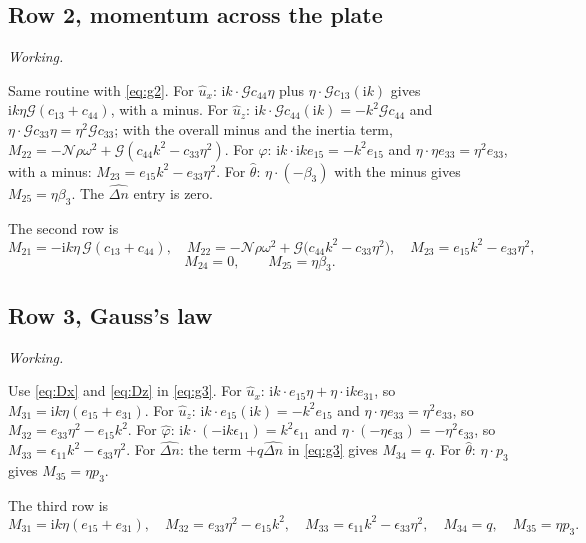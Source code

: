 \documentclass[11pt,a4paper]{article}
\newif\ifshowworked \showworkedtrue
\newenvironment{worked}{\ifshowworked\par\smallskip\noindent\textit{Working.}\par\else\setbox0\vbox\bgroup\fi}{\ifshowworked\par\smallskip\else\egroup\fi}
\newcommand{\Nc}{\mathcal{N}}
\newcommand{\Gc}{\mathcal{G}}
\newcommand{\ii}{\mathrm{i}}
\newcommand{\bx}{\hat u_x}
\newcommand{\bz}{\hat u_z}
\newcommand{\bp}{\hat\varphi}
\newcommand{\bn}{\widehat{\Delta n}}
\newcommand{\bt}{\hat\theta}
\begin{document}
\subsection{Row 2, momentum across the plate}

\begin{worked}
Same routine with \eqref{eq:g2}. For $\bx$: $\ii k\cdot\Gc c_{44}\eta$ plus $\eta\cdot\Gc c_{13}(\ii k)$ gives
$\ii k\eta\Gc(c_{13}+c_{44})$, with a minus.
For $\bz$: $\ii k\cdot\Gc c_{44}(\ii k)=-k^2\Gc c_{44}$ and $\eta\cdot\Gc c_{33}\eta=\eta^2\Gc c_{33}$; with the
overall minus and the inertia term, $M_{22}=-\Nc\rho\omega^2+\Gc(c_{44}k^2-c_{33}\eta^2)$.
For $\bp$: $\ii k\cdot\ii k e_{15}=-k^2e_{15}$ and $\eta\cdot\eta e_{33}=\eta^2e_{33}$, with a minus:
$M_{23}=e_{15}k^2-e_{33}\eta^2$.
For $\bt$: $\eta\cdot(-\beta_3)$ with the minus gives $M_{25}=\eta\beta_3$. The $\bn$ entry is zero.
\end{worked}

\noindent The second row is
\begin{equation}\label{eq:row2}
M_{21}=-\ii k\eta\,\Gc(c_{13}+c_{44}),\quad
M_{22}=-\Nc\rho\omega^2+\Gc\bigl(c_{44}k^2-c_{33}\eta^2\bigr),\quad
M_{23}=e_{15}k^2-e_{33}\eta^2,
\end{equation}
\begin{equation}\label{eq:row2b}
M_{24}=0,\qquad M_{25}=\eta\beta_3 .
\end{equation}

\subsection{Row 3, Gauss's law}

\begin{worked}
Use \eqref{eq:Dx} and \eqref{eq:Dz} in \eqref{eq:g3}. For $\bx$: $\ii k\cdot e_{15}\eta+\eta\cdot\ii k e_{31}$,
so $M_{31}=\ii k\eta(e_{15}+e_{31})$.
For $\bz$: $\ii k\cdot e_{15}(\ii k)=-k^2e_{15}$ and $\eta\cdot\eta e_{33}=\eta^2e_{33}$, so
$M_{32}=e_{33}\eta^2-e_{15}k^2$.
For $\bp$: $\ii k\cdot(-\ii k\epsilon_{11})=k^2\epsilon_{11}$ and $\eta\cdot(-\eta\epsilon_{33})=-\eta^2\epsilon_{33}$,
so $M_{33}=\epsilon_{11}k^2-\epsilon_{33}\eta^2$.
For $\bn$: the term $+q\bn$ in \eqref{eq:g3} gives $M_{34}=q$.
For $\bt$: $\eta\cdot p_3$ gives $M_{35}=\eta p_3$.
\end{worked}

\noindent The third row is
\begin{equation}\label{eq:row3}
M_{31}=\ii k\eta(e_{15}+e_{31}),\quad
M_{32}=e_{33}\eta^2-e_{15}k^2,\quad
M_{33}=\epsilon_{11}k^2-\epsilon_{33}\eta^2,\quad
M_{34}=q,\quad
M_{35}=\eta p_3 .
\end{equation}
\end{document}
